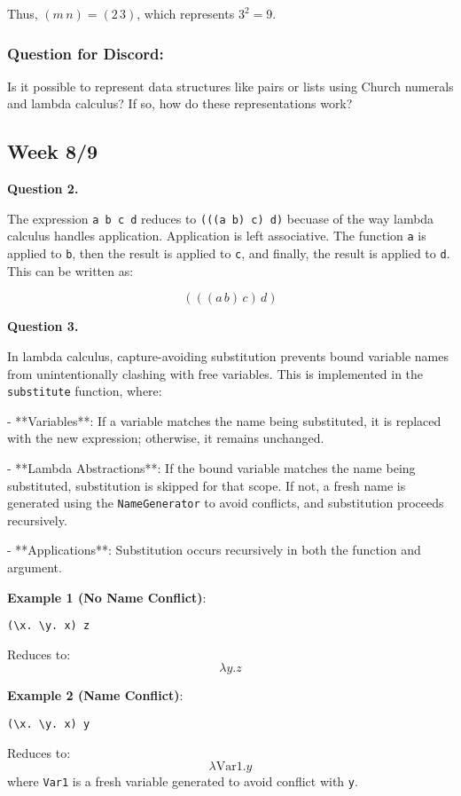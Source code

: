 \documentclass{article}
\theoremstyle{theorem}
\theoremstyle{definition}
\theoremstyle{remark}
\begin{document}
Thus, \((m \, n) = (2 \, 3)\), which represents \(3^2 = 9\).
\subsubsection*{Question for Discord:}
Is it possible to represent data structures like pairs or lists using Church numerals and lambda calculus? If so, how do these representations work?

\subsection{Week 8/9}


\textbf{Question 2.}

The expression \texttt{a b c d} reduces to \texttt{(((a b) c) d)} becuase of the way lambda calculus handles application. Application is left associative. The function \texttt{a} is applied to \texttt{b}, then the result is applied to \texttt{c}, and finally, the result is applied to \texttt{d}. This can be written as:

\[
 (((a \, b) \, c) \, d)
\]

\textbf{Question 3.}

In lambda calculus, capture-avoiding substitution prevents bound variable names from unintentionally clashing with free variables. This is implemented in the \texttt{substitute} function, where:

- **Variables**: If a variable matches the name being substituted, it is replaced with the new expression; otherwise, it remains unchanged.

- **Lambda Abstractions**: If the bound variable matches the name being substituted, substitution is skipped for that scope. If not, a fresh name is generated using the \texttt{NameGenerator} to avoid conflicts, and substitution proceeds recursively.

- **Applications**: Substitution occurs recursively in both the function and argument.

\textbf{Example 1 (No Name Conflict)}:
\begin{verbatim}
(\x. \y. x) z
\end{verbatim}
Reduces to: 
\[
\lambda y. z
\]

\textbf{Example 2 (Name Conflict)}:
\begin{verbatim}
(\x. \y. x) y
\end{verbatim}
Reduces to: 
\[
\lambda \text{Var1}. y
\]
where \texttt{Var1} is a fresh variable generated to avoid conflict with \texttt{y}.
\end{document}
